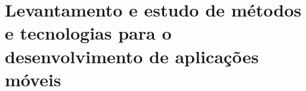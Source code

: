 \section{Levantamento e estudo de métodos e tecnologias para o desenvolvimento de aplicações móveis}



